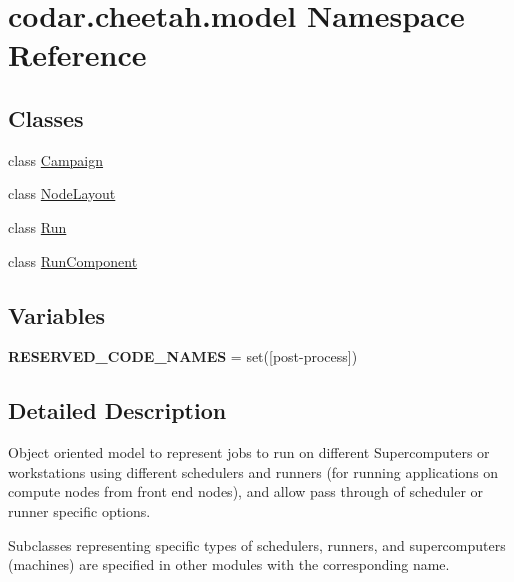 \hypertarget{namespacecodar_1_1cheetah_1_1model}{}\section{codar.\+cheetah.\+model Namespace Reference}
\label{namespacecodar_1_1cheetah_1_1model}
\subsection*{Classes}
\begin{DoxyCompactItemize}
\item 
class \hyperlink{classcodar_1_1cheetah_1_1model_1_1_campaign}{Campaign}
\item 
class \hyperlink{classcodar_1_1cheetah_1_1model_1_1_node_layout}{Node\+Layout}
\item 
class \hyperlink{classcodar_1_1cheetah_1_1model_1_1_run}{Run}
\item 
class \hyperlink{classcodar_1_1cheetah_1_1model_1_1_run_component}{Run\+Component}
\end{DoxyCompactItemize}
\subsection*{Variables}
\begin{DoxyCompactItemize}
\item 
\mbox{\label{namespacecodar_1_1cheetah_1_1model_a7d8bea761417a3809aef433e77fd2887}} 
{\bfseries R\+E\+S\+E\+R\+V\+E\+D\+\_\+\+C\+O\+D\+E\+\_\+\+N\+A\+M\+ES} = set(\mbox{[}\textquotesingle{}post-\/process\textquotesingle{}\mbox{]})
\end{DoxyCompactItemize}


\subsection{Detailed Description}
\begin{DoxyVerb}Object oriented model to represent jobs to run on different Supercomputers or
workstations using different schedulers and runners (for running applications
on compute nodes from front end nodes), and allow pass through of scheduler
or runner specific options.

Subclasses representing specific types of schedulers, runners, and
supercomputers (machines) are specified in other modules with the corresponding
name.
\end{DoxyVerb}
 